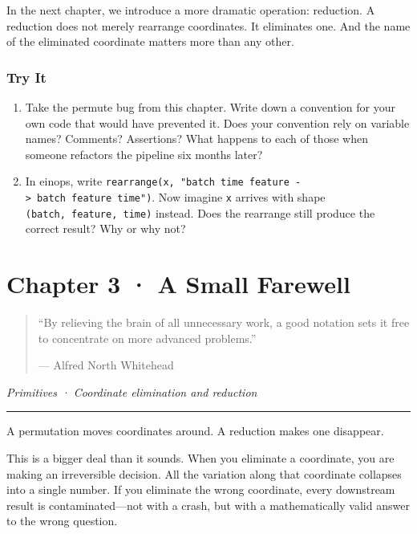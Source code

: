 \documentclass[11pt,]{article}
\begin{document}
In the next chapter, we introduce a more dramatic operation: reduction.
A reduction does not merely rearrange coordinates. It eliminates one.
And the name of the eliminated coordinate matters more than any other.

\hypertarget{try-it-1}{%
\subsubsection{Try It}\label{try-it-1}}

\begin{enumerate}
\def\labelenumi{\arabic{enumi}.}
\item
  Take the permute bug from this chapter. Write down a convention for
  your own code that would have prevented it. Does your convention rely
  on variable names? Comments? Assertions? What happens to each of those
  when someone refactors the pipeline six months later?
\item
  In einops, write
  \texttt{rearrange(x,\ "batch\ time\ feature\ -\textgreater{}\ batch\ feature\ time")}.
  Now imagine \texttt{x} arrives with shape
  \texttt{(batch,\ feature,\ time)} instead. Does the rearrange still
  produce the correct result? Why or why not?
\end{enumerate}

\newpage

\hypertarget{chapter-3-a-small-farewell}{%
\section{Chapter 3 · A Small
Farewell}\label{chapter-3-a-small-farewell}}

\begin{quote}
``By relieving the brain of all unnecessary work, a good notation sets
it free to concentrate on more advanced problems.''

--- Alfred North Whitehead
\end{quote}

\emph{Primitives · Coordinate elimination and reduction}

\begin{center}\rule{0.5\linewidth}{0.4pt}\end{center}

A permutation moves coordinates around. A reduction makes one disappear.

This is a bigger deal than it sounds. When you eliminate a coordinate,
you are making an irreversible decision. All the variation along that
coordinate collapses into a single number. If you eliminate the wrong
coordinate, every downstream result is contaminated---not with a crash,
but with a mathematically valid answer to the wrong question.
\end{document}

